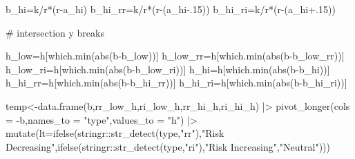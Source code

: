 \documentclass[
  super,
  preprint,
  3p]{elsarticle}
\newenvironment{Shaded}{\begin{snugshade}}{\end{snugshade}}
\newcommand{\AttributeTok}[1]{\textcolor[rgb]{0.40,0.45,0.13}{#1}}
\newcommand{\CommentTok}[1]{\textcolor[rgb]{0.37,0.37,0.37}{#1}}
\newcommand{\FloatTok}[1]{\textcolor[rgb]{0.68,0.00,0.00}{#1}}
\newcommand{\FunctionTok}[1]{\textcolor[rgb]{0.28,0.35,0.67}{#1}}
\newcommand{\NormalTok}[1]{\textcolor[rgb]{0.00,0.23,0.31}{#1}}
\newcommand{\OtherTok}[1]{\textcolor[rgb]{0.00,0.23,0.31}{#1}}
\newcommand{\SpecialCharTok}[1]{\textcolor[rgb]{0.37,0.37,0.37}{#1}}
\newcommand{\StringTok}[1]{\textcolor[rgb]{0.13,0.47,0.30}{#1}}
\theoremstyle{plain}
\theoremstyle{plain}
\theoremstyle{remark}
\begin{document}
\begin{Shaded}
\begin{Highlighting}[]
\NormalTok{b\_hi}\OtherTok{=}\NormalTok{k}\SpecialCharTok{/}\NormalTok{r}\SpecialCharTok{*}\NormalTok{(r}\SpecialCharTok{{-}}\NormalTok{a\_hi)}
\NormalTok{b\_hi\_rr}\OtherTok{=}\NormalTok{k}\SpecialCharTok{/}\NormalTok{r}\SpecialCharTok{*}\NormalTok{(r}\SpecialCharTok{{-}}\NormalTok{(a\_hi}\FloatTok{{-}.15}\NormalTok{))}
\NormalTok{b\_hi\_ri}\OtherTok{=}\NormalTok{k}\SpecialCharTok{/}\NormalTok{r}\SpecialCharTok{*}\NormalTok{(r}\SpecialCharTok{{-}}\NormalTok{(a\_hi}\FloatTok{+.15}\NormalTok{))}

\CommentTok{\# intersection y breaks}

\NormalTok{h\_low}\OtherTok{=}\NormalTok{h[}\FunctionTok{which.min}\NormalTok{(}\FunctionTok{abs}\NormalTok{(b}\SpecialCharTok{{-}}\NormalTok{b\_low))]}
\NormalTok{h\_low\_rr}\OtherTok{=}\NormalTok{h[}\FunctionTok{which.min}\NormalTok{(}\FunctionTok{abs}\NormalTok{(b}\SpecialCharTok{{-}}\NormalTok{b\_low\_rr))]}
\NormalTok{h\_low\_ri}\OtherTok{=}\NormalTok{h[}\FunctionTok{which.min}\NormalTok{(}\FunctionTok{abs}\NormalTok{(b}\SpecialCharTok{{-}}\NormalTok{b\_low\_ri))]}
\NormalTok{h\_hi}\OtherTok{=}\NormalTok{h[}\FunctionTok{which.min}\NormalTok{(}\FunctionTok{abs}\NormalTok{(b}\SpecialCharTok{{-}}\NormalTok{b\_hi))]}
\NormalTok{h\_hi\_rr}\OtherTok{=}\NormalTok{h[}\FunctionTok{which.min}\NormalTok{(}\FunctionTok{abs}\NormalTok{(b}\SpecialCharTok{{-}}\NormalTok{b\_hi\_rr))]}
\NormalTok{h\_hi\_ri}\OtherTok{=}\NormalTok{h[}\FunctionTok{which.min}\NormalTok{(}\FunctionTok{abs}\NormalTok{(b}\SpecialCharTok{{-}}\NormalTok{b\_hi\_ri))]}

\NormalTok{temp}\OtherTok{\textless{}{-}}\FunctionTok{data.frame}\NormalTok{(b,rr\_low\_h,ri\_low\_h,rr\_hi\_h,ri\_hi\_h) }\SpecialCharTok{|\textgreater{}} 
  \FunctionTok{pivot\_longer}\NormalTok{(}\AttributeTok{cols =} \SpecialCharTok{{-}}\NormalTok{b,}\AttributeTok{names\_to =} \StringTok{"type"}\NormalTok{,}\AttributeTok{values\_to =} \StringTok{"h"}\NormalTok{) }\SpecialCharTok{|\textgreater{}} 
  \FunctionTok{mutate}\NormalTok{(}\AttributeTok{lt=}\FunctionTok{ifelse}\NormalTok{(stringr}\SpecialCharTok{::}\FunctionTok{str\_detect}\NormalTok{(type,}\StringTok{"rr"}\NormalTok{),}\StringTok{"Risk Decreasing"}\NormalTok{,}\FunctionTok{ifelse}\NormalTok{(stringr}\SpecialCharTok{::}\FunctionTok{str\_detect}\NormalTok{(type,}\StringTok{"ri"}\NormalTok{),}\StringTok{"Risk Increasing"}\NormalTok{,}\StringTok{"Neutral"}\NormalTok{)))}



\end{Highlighting}
\end{Shaded}
\end{document}
